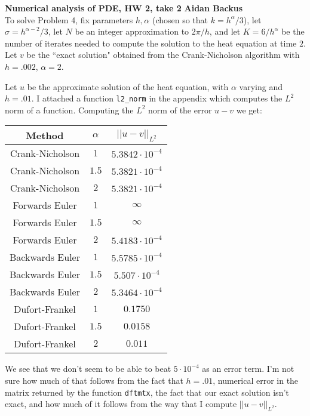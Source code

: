 \documentclass[10pt]{article}
\theoremstyle{definition}
\begin{document}
\noindent
\large\textbf{Numerical analysis of PDE, HW 2, take 2} \hfill \textbf{Aidan Backus} \\

To solve Problem 4, fix parameters $h, \alpha$ (chosen so that $k = h^\alpha/3$), let $\sigma = h^{\alpha - 2}/3$, let $N$ be an integer approximation to $2\pi/h$, and let $K = 6/h^\alpha$ be the number of iterates needed to compute the solution to the heat equation at time $2$.
Let $v$ be the ``exact solution" obtained from the Crank-Nicholson algorithm with $h = .002$, $\alpha = 2$.

Let $u$ be the approximate solution of the heat equation, with $\alpha$ varying and $h = .01$.
I attached a function \verb+l2_norm+ in the appendix which computes the $L^2$ norm of a function. Computing the $L^2$ norm of the error $u - v$ we get:
\begin{center}\begin{tabular}{c | c | c}
Method & $\alpha$ & $||u - v||_{L^2}$ \\
\hline
Crank-Nicholson & $1$ & $5.3842 \cdot 10^{-4}$ \\
Crank-Nicholson & $1.5$ & $5.3821 \cdot 10^{-4}$ \\
Crank-Nicholson & $2$ & $5.3821 \cdot 10^{-4}$ \\
Forwards Euler & $1$ & $\infty$ \\
Forwards Euler & $1.5$ & $\infty$ \\
Forwards Euler & $2$ & $5.4183 \cdot 10^{-4}$ \\
Backwards Euler & $1$ & $5.5785 \cdot 10^{-4}$ \\
Backwards Euler & $1.5$ & $5.507 \cdot 10^{-4}$ \\
Backwards Euler & $2$ & $5.3464 \cdot 10^{-4}$ \\
Dufort-Frankel & $1$ & $0.1750$ \\
Dufort-Frankel & $1.5$ & $0.0158$ \\
Dufort-Frankel & $2$ & $0.011$
\end{tabular}\end{center}
We see that we don't seem to be able to beat $5 \cdot 10^{-4}$ as an error term. I'm not sure how much of that follows from the fact that $h = .01$, numerical error in the matrix returned by the function \verb+dftmtx+, the fact that our exact solution isn't exact, and how much of it follows from the way that I compute $||u - v||_{L^2}$.
\end{document}
